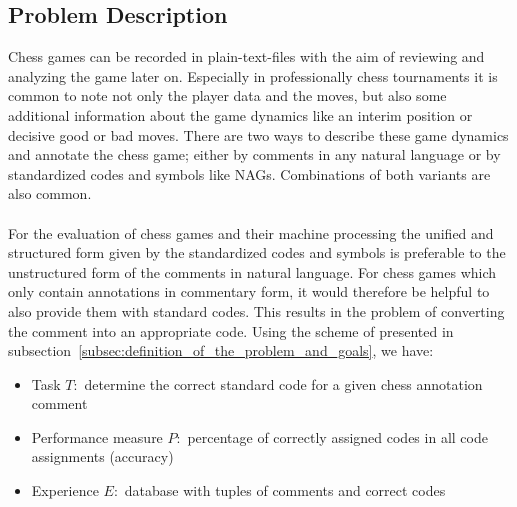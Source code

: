 \documentclass[article,type=msc,colorback,accentcolor=tud7b]{tudthesis}
\begin{document}
  \subsection{Problem Description}
    Chess games can be recorded in plain-text-files with the aim of reviewing and analyzing the game later on. Especially in professionally chess tournaments it is common to note not only the player data and the moves, but also some additional information about the game dynamics like an interim position or decisive good or bad moves. There are two ways to describe these game dynamics and annotate the chess game; either by comments in any natural language or by standardized codes and symbols like NAGs. Combinations of both variants are also common. \\\\
    For the evaluation of chess games and their machine processing the unified and structured form given by the standardized codes and symbols is preferable to the unstructured form of the comments in natural language. For chess games which only contain annotations in commentary form, it would therefore be helpful to also provide them with standard codes. This results in the problem of converting the comment into an appropriate code. Using the scheme of \citeauthor{Mitchell1997} presented in subsection~\ref{subsec:definition_of_the_problem_and_goals}, we have:
    \begin{itemize}[noitemsep]
      \item Task $T:$ determine the correct standard code for a given chess annotation comment
      \item Performance measure $P:$ percentage of correctly assigned codes in all code assignments (accuracy)
      \item Experience $E:$ database with tuples of comments and correct codes
    \end{itemize}
      
\end{document}
